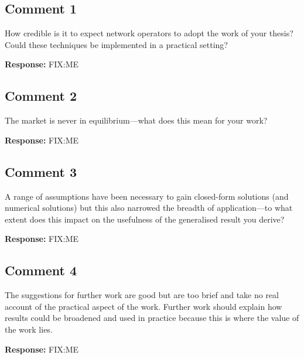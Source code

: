 \documentclass[10pt,a4paper,notitlepage]{article}
\numberwithin{equation}{section}
\begin{document}
\subsection{Comment 1}
How credible is it to expect network operators to adopt the work of your thesis? Could these techniques be implemented in a practical setting?

\textbf{Response:}
FIX:ME

\subsection{Comment 2}
The market is never in equilibrium---what does this mean for your work?

\textbf{Response:}
FIX:ME

\subsection{Comment 3}
A range of assumptions have been necessary to gain closed-form solutions (and numerical solutions) but this also narrowed the breadth of application---to what extent does this impact on the usefulness of the generalised result you derive?

\textbf{Response:}
FIX:ME

\subsection{Comment 4}
The suggestions for further work are good but are too brief and take no real account of the practical aspect of the work. Further work should explain how results could be broadened and used in practice because this is where the value of the work lies.

\textbf{Response:}
FIX:ME
\end{document}
